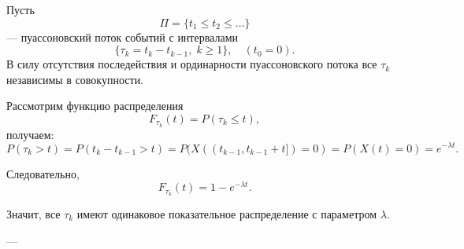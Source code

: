 Пусть
\[
	\Pi = \{ t_1 \le t_2 \le \ldots \}
\]
— пуассоновский поток событий с интервалами
\[
	\{ \tau_k = t_k - t_{k-1}, \; k \ge 1 \}, \quad (t_0 = 0).
\]
В силу отсутствия последействия и ординарности пуассоновского потока все \(\tau_k\) независимы в совокупности.

Рассмотрим функцию распределения
\[
	F_{\tau_k}(t) = P(\tau_k \le t),
\]
получаем:
\[
	P(\tau_k > t) = P(t_k - t_{k-1} > t) = P(X((t_{k-1}, t_{k-1}+t]) = 0) = P(X(t) = 0) = e^{-\lambda t}.
\]

Следовательно,
\[
	F_{\tau_k}(t) = 1 - e^{-\lambda t}.
\]

Значит, все \(\tau_k\) имеют одинаковое показательное распределение с параметром \(\lambda\).

---